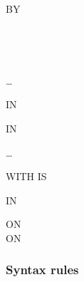 \begin{syntax}
   \identifier

  \begin{0-1}
     BY
    \begin{0-1}
    \end{0-1}
    \begin{1=}
      \identifier \\
      \literal
    \end{1=}
    \begin{1=}
      \begin{0-1}
      \end{0-1}
      \begin{1=}
        \identifier \\
        \literal
      \end{1=}
    \end{1=} \ldots
  \end{0-1}

  \begin{1=}
    \identifier
    \begin{0-1}
       IN \identifier
    \end{0-1}
    \begin{0-1}
       IN \identifier
    \end{0-1}
  \end{1=} \ldots

  \begin{0-1}
    WITH  IS \identifier
  \end{0-1}

  \begin{0-1}
     IN \identifier
  \end{0-1}

  \begin{0+}
    ON  \imperativestatement \\
     ON  \imperativestatement
  \end{0+}

  \begin{0-1}
  \end{0-1}
\end{syntax}

\subsubsection{Syntax rules}

